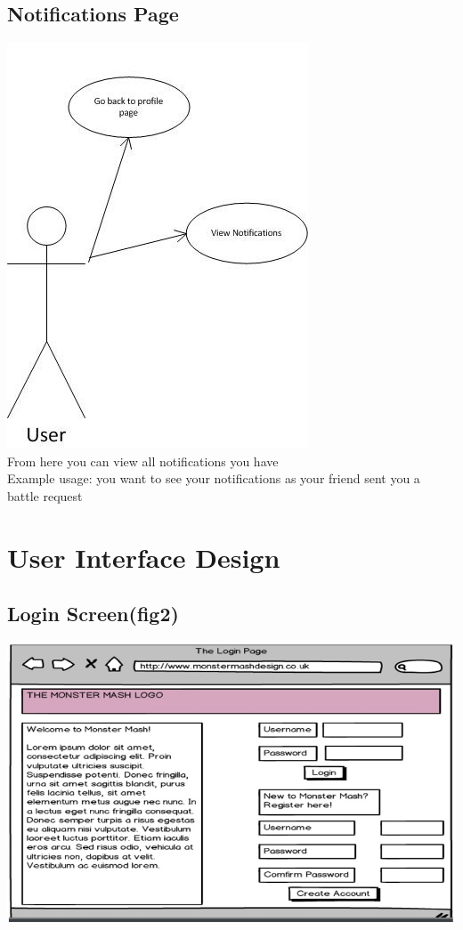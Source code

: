 \documentclass{project}
\begin{document}
\subsection{Notifications Page}
\includegraphics[scale=0.6]{NotifiPageUseCase.jpg}
\\
From here you can view all notifications you have
\\
Example usage: you want to see your notifications as your friend sent you a battle request


\section{User Interface Design}

\subsection{Login Screen(fig2)}
\includegraphics[scale=0.6]{loginPage.jpg}
\end{document}

